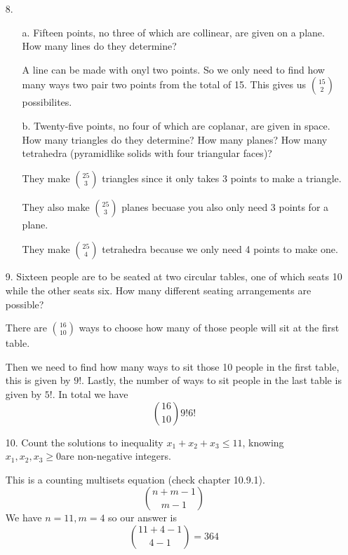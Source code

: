 \documentclass[letterpaper,11pt]{article}
\begin{document}
\begin{enumerate}
    \item[8.]
    \begin{enumerate}
        \item [a.] Fifteen points, no three of which are collinear, are given on a plane. How many lines do they determine?
        \item [] A line can be made with onyl two points. So we only need to find how many ways two pair two points from the total of 15. This gives us $15 \choose 2$ possibilites.
        \item [b.] Twenty-five points, no four of which are coplanar, are given in space. How many triangles do they determine?
        How many planes? How many tetrahedra (pyramidlike solids with four triangular faces)?
        \item [] They make $25 \choose 3$ triangles since it only takes 3 points to make a triangle. 
        \item [] They also make $25 \choose 3$ planes becuase you also only need 3 points for a plane.
        \item [] They make $25 \choose 4$ tetrahedra because we only need 4 points to make one. 
    \end{enumerate}  
    \newpage
    \item [9.] Sixteen people are to be seated at two circular tables, one of which seats 10 while the other seats six. How
    many different seating arrangements are possible?
    \item[] There are $16 \choose 10$ ways to choose how many of those people will sit at the first table. 
    \item[] Then we need to find how many ways to sit those 10 people in the first table, this is given by $9!$. Lastly, the number of ways to sit people in the last table is given by $5!$. In total we have $${16 \choose 10} 9! 6!$$
    \item[10.] Count the solutions to inequality $x_1+x_2+x_3 \leq 11$, knowing $x_1, x_2, x_3 \geq 0$are non-negative integers. 
    \item[]  This is a counting multisets equation (check chapter 10.9.1). $${n+m-1} \choose {m-1}$$ 
    We have $n = 11, m = 4$ so our answer is $${{11+4-1} \choose {4-1}} = 364$$
\end{enumerate}
\end{document}
